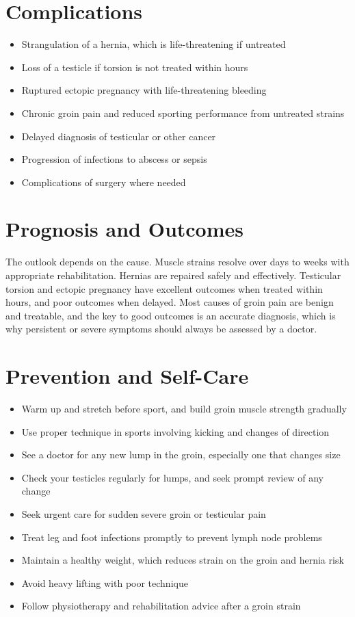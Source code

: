 \section*{Complications}
\begin{itemize}
    \item Strangulation of a hernia, which is life-threatening if untreated
    \item Loss of a testicle if torsion is not treated within hours
    \item Ruptured ectopic pregnancy with life-threatening bleeding
    \item Chronic groin pain and reduced sporting performance from untreated strains
    \item Delayed diagnosis of testicular or other cancer
    \item Progression of infections to abscess or sepsis
    \item Complications of surgery where needed
\end{itemize}

\section*{Prognosis and Outcomes}
The outlook depends on the cause. Muscle strains resolve over days to weeks with appropriate rehabilitation. Hernias are repaired safely and effectively. Testicular torsion and ectopic pregnancy have excellent outcomes when treated within hours, and poor outcomes when delayed. Most causes of groin pain are benign and treatable, and the key to good outcomes is an accurate diagnosis, which is why persistent or severe symptoms should always be assessed by a doctor.

\section*{Prevention and Self-Care}
\begin{itemize}
    \item Warm up and stretch before sport, and build groin muscle strength gradually
    \item Use proper technique in sports involving kicking and changes of direction
    \item See a doctor for any new lump in the groin, especially one that changes size
    \item Check your testicles regularly for lumps, and seek prompt review of any change
    \item Seek urgent care for sudden severe groin or testicular pain
    \item Treat leg and foot infections promptly to prevent lymph node problems
    \item Maintain a healthy weight, which reduces strain on the groin and hernia risk
    \item Avoid heavy lifting with poor technique
    \item Follow physiotherapy and rehabilitation advice after a groin strain
\end{itemize}

